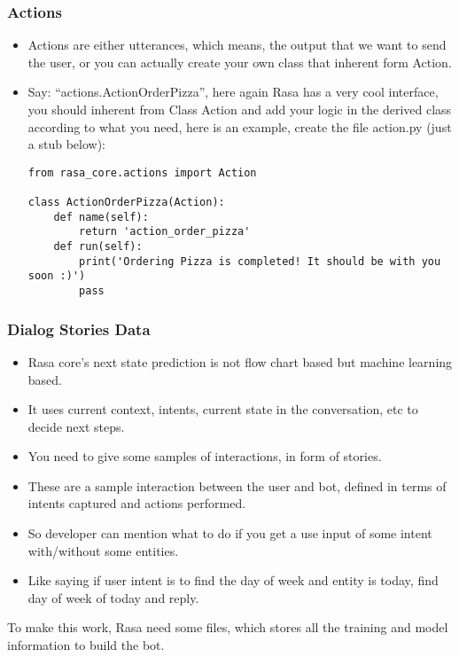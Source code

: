  \begin{frame}[fragile]\frametitle{Actions}
\begin{itemize}
\item Actions are either utterances, which means, the output that we want to send the user, or you can actually create your own class that inherent form Action. 
\item Say: ``actions.ActionOrderPizza'', here again Rasa has a very cool interface, you should inherent from Class Action and add your logic in the derived class according to what you need, here is an example, create the file action.py (just a stub below):
\begin{lstlisting}
from rasa_core.actions import Action

class ActionOrderPizza(Action):
    def name(self):
        return 'action_order_pizza'
    def run(self):
        print('Ordering Pizza is completed! It should be with you soon :)')
        pass
\end{lstlisting}
\end{itemize}

\end{frame}


 \begin{frame}[fragile]\frametitle{Dialog Stories Data}
\begin{itemize}
\item Rasa core's next state prediction is not flow chart based but machine learning based. 
\item It uses current context, intents, current state in the conversation, etc to decide next steps.
\item You need to give some samples of interactions, in form of stories.
\item These are a sample interaction between the user and bot, defined in terms of intents captured and actions performed. 
\item So developer can mention what to do if you get a use input of some intent with/without some entities. 
\item Like saying if user intent is to find the day of week and entity is today, find day of week of today and reply.
\end{itemize}

To make this work, Rasa need some files, which stores all the training and model information to build the bot.
\end{frame}

